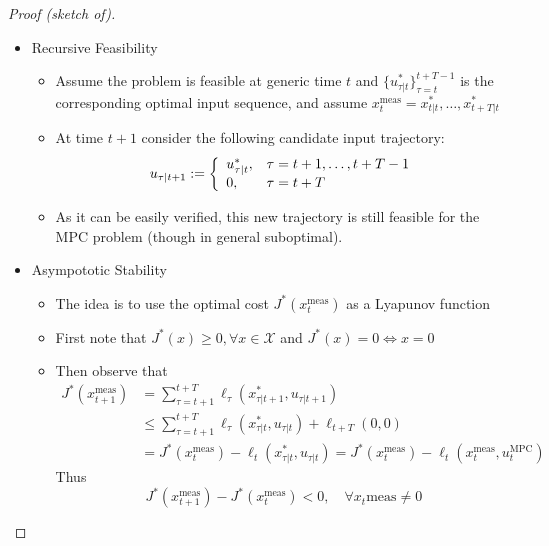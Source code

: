 \documentclass{book}
\theoremstyle{definition}
\theoremstyle{remark}
\theoremstyle{remark}
\begin{document}
\begin{proof}[Proof (sketch of)]

    \begin{itemize}
        \item Recursive Feasibility
            \begin{itemize}
                \item Assume the problem is feasible at generic time $t$ and $\{u^*_{\tau|t}\}^{t+T-1}_{\tau=t}$ is the corresponding optimal input sequence, and assume $x_t^{\text{meas}}=x^*_{t|t},\dots,x^*_{t+T|t}$
                \item At time $t+1$ consider the following candidate input trajectory: 
                    \[
                        u_{\tau|t+1}:=\left\{\begin{array}{l l}
                                u_{\tau|t}^*, & \tau = t+1,\dots,t+T-1\\
                                0, & \tau = t+T
                        \end{array} \right.
                    \]
                \item As it can be easily verified, this new trajectory is still feasible for the MPC problem (though in general suboptimal).
            \end{itemize}
        \item Asympototic Stability 
            \begin{itemize}
                \item The idea is to use the optimal cost $J^*(x_t^{\text{meas}})$ as a Lyapunov function 
                \item First note that $J^*(x)\geq 0, \forall x\in\mathcal{X}$ and $J^*(x)=0 \iff x=0$
                    \item Then observe that 
                        \begin{align}
                            J^*(x_{t+1}^{\text{meas}}) & =\displaystyle\sum_{\tau=t+1}^{t+T}\ell_{\tau}(x_{\tau|t+1}^*,u_{\tau|t+1})\\
                                                       &\leq \displaystyle\sum_{\tau=t+1}^{t+T}\ell_{\tau}(x_{\tau|t}^*,u_{\tau|t})+\ell_{t+T}(0,0)\\
                                                       & =J^*(x_t^{\text{meas}})-\ell_t(x_{\tau|t}^*,u_{\tau|t})=J^*(x_t^{\text{meas}})-\ell_t(x_t^{\text{meas}},u_t^{\text{MPC}})
                        \end{align}
                        Thus
                        \[
                            J^*(x_{t+1}^{\text{meas}})-J^*(x_t^{\text{meas}})<0, \quad \forall x_t{\text{meas}}\neq 0
                        \]
            \end{itemize}
    \end{itemize}
\end{proof}
\end{document}
